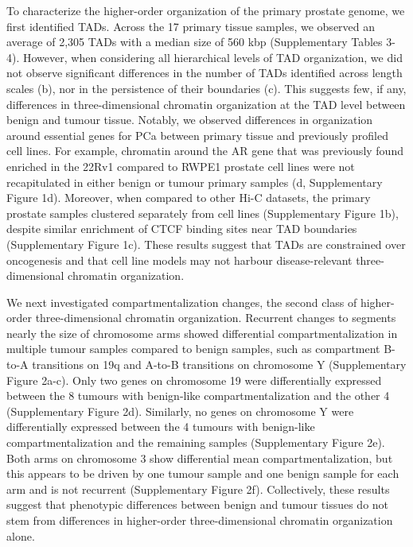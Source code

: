 To characterize the higher-order organization of the primary prostate genome, we first identified TADs.
Across the 17 primary tissue samples, we observed an average of 2,305 TADs with a median size of 560 kbp (Supplementary Tables 3-4).
However, when considering all hierarchical levels of TAD organization, we did not observe significant differences in the number of TADs identified across length scales (b), nor in the persistence of their boundaries (c).
This suggests few, if any, differences in three-dimensional chromatin organization at the TAD level between benign and tumour tissue.
Notably, we observed differences in organization around essential genes for PCa between primary tissue and previously profiled cell lines.
For example, chromatin around the AR gene that was previously found enriched in the 22Rv1 compared to RWPE1 prostate cell lines \cite{rhieHighresolution3DEpigenomic2019} were not recapitulated in either benign or tumour primary samples (d, Supplementary Figure 1d).
Moreover, when compared to other Hi-C datasets, the primary prostate samples clustered separately from cell lines (Supplementary Figure 1b), despite similar enrichment of CTCF binding sites near TAD boundaries (Supplementary Figure 1c).
These results suggest that TADs are constrained over oncogenesis and that cell line models may not harbour disease-relevant three-dimensional chromatin organization.

We next investigated compartmentalization changes, the second class of higher-order three-dimensional chromatin organization.
Recurrent changes to segments nearly the size of chromosome arms showed differential compartmentalization in multiple tumour samples compared to benign samples, such as compartment B-to-A transitions on 19q and A-to-B transitions on chromosome Y (Supplementary Figure 2a-c).
Only two genes on chromosome 19 were differentially expressed between the 8 tumours with benign-like compartmentalization and the other 4 (Supplementary Figure 2d).
Similarly, no genes on chromosome Y were differentially expressed between the 4 tumours with benign-like compartmentalization and the remaining samples (Supplementary Figure 2e).
Both arms on chromosome 3 show differential mean compartmentalization, but this appears to be driven by one tumour sample and one benign sample for each arm and is not recurrent (Supplementary Figure 2f).
Collectively, these results suggest that phenotypic differences between benign and tumour tissues do not stem from differences in higher-order three-dimensional chromatin organization alone.

